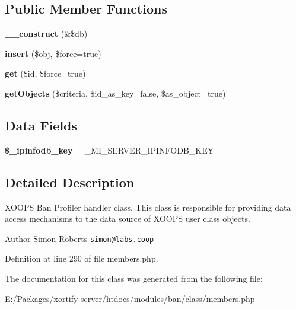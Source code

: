 \subsection*{Public Member Functions}
\begin{DoxyCompactItemize}
\item 
\hypertarget{classban_members_handler_aaf2ef772755ec6f361d44e16cc9ffd69}{{\bfseries \-\_\-\-\_\-construct} (\&\$db)}\label{classban_members_handler_aaf2ef772755ec6f361d44e16cc9ffd69}

\item 
\hypertarget{classban_members_handler_acb0b5c3bb58794228e1fd2b4f888323f}{{\bfseries insert} (\$obj, \$force=true)}\label{classban_members_handler_acb0b5c3bb58794228e1fd2b4f888323f}

\item 
\hypertarget{classban_members_handler_ab176f2d356e6c90818fb6d1a409e48b5}{{\bfseries get} (\$id, \$force=true)}\label{classban_members_handler_ab176f2d356e6c90818fb6d1a409e48b5}

\item 
\hypertarget{classban_members_handler_aa7eafee5b065d74fc32cb5f5af4862d6}{{\bfseries get\-Objects} (\$criteria, \$id\-\_\-as\-\_\-key=false, \$as\-\_\-object=true)}\label{classban_members_handler_aa7eafee5b065d74fc32cb5f5af4862d6}

\end{DoxyCompactItemize}
\subsection*{Data Fields}
\begin{DoxyCompactItemize}
\item 
\hypertarget{classban_members_handler_a1d74d0e6862ecb76f29894b59dd2a5e2}{{\bfseries \$\-\_\-ipinfodb\-\_\-key} = \-\_\-\-M\-I\-\_\-\-S\-E\-R\-V\-E\-R\-\_\-\-I\-P\-I\-N\-F\-O\-D\-B\-\_\-\-K\-E\-Y}\label{classban_members_handler_a1d74d0e6862ecb76f29894b59dd2a5e2}

\end{DoxyCompactItemize}


\subsection{Detailed Description}
X\-O\-O\-P\-S Ban Profiler handler class. This class is responsible for providing data access mechanisms to the data source of X\-O\-O\-P\-S user class objects.

\begin{DoxyAuthor}{Author}
Simon Roberts \href{mailto:simon@labs.coop}{\tt simon@labs.\-coop} 
\end{DoxyAuthor}


Definition at line 290 of file members.\-php.



The documentation for this class was generated from the following file\-:\begin{DoxyCompactItemize}
\item 
E\-:/\-Packages/xortify server/htdocs/modules/ban/class/members.\-php\end{DoxyCompactItemize}
